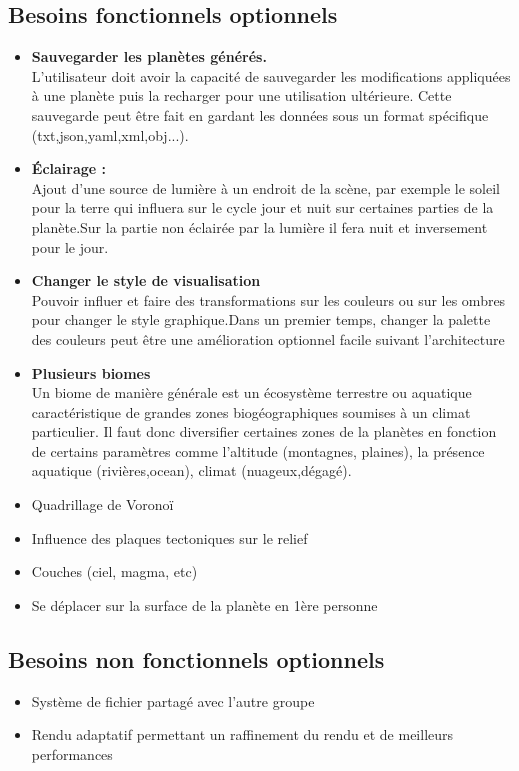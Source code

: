 \documentclass[a4paper]{article}
\begin{document}
\subsection{Besoins fonctionnels optionnels}
\begin{itemize}
\item \textbf{Sauvegarder les planètes générés.} \\
    L'utilisateur doit avoir la capacité de sauvegarder les modifications appliquées à une planète puis la recharger pour une utilisation ultérieure. Cette sauvegarde peut être fait en gardant les données sous un format spécifique (txt,json,yaml,xml,obj...).
    
\item \textbf{Éclairage :} \\
    Ajout d'une source de lumière à un endroit de la scène, par exemple le soleil pour la terre qui influera sur le cycle jour et nuit sur certaines parties de la planète.Sur la partie non éclairée par la lumière il fera nuit et inversement pour le jour. 
    
\item \textbf{Changer le style de visualisation} \\
    Pouvoir influer et faire des transformations sur les couleurs ou sur les ombres pour changer le style graphique.Dans un premier temps, changer la palette des couleurs peut être une amélioration optionnel facile suivant l'architecture

\item \textbf{Plusieurs biomes}\\
    Un biome de manière générale est un écosystème terrestre ou aquatique caractéristique de grandes zones biogéographiques soumises à un climat particulier. Il faut donc diversifier certaines zones de la planètes en fonction de certains paramètres comme l'altitude (montagnes, plaines), la présence aquatique (rivières,ocean), climat (nuageux,dégagé).
    
\item Quadrillage de Voronoï
\item Influence des plaques tectoniques sur le relief
\item Couches (ciel, magma, etc)
\item Se déplacer sur la surface de la planète en 1ère personne
\end{itemize}
    
\subsection{Besoins non fonctionnels optionnels}
\begin{itemize}
\item Système de fichier partagé avec l’autre groupe
\item Rendu adaptatif permettant un raffinement du rendu et de meilleurs performances

\end{itemize}
\end{document}
